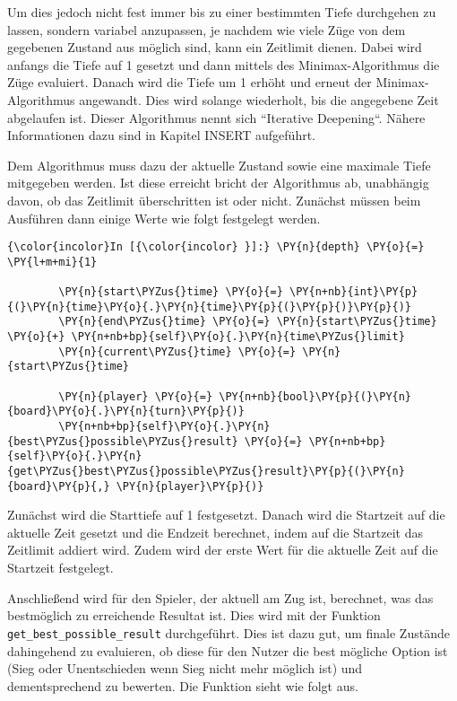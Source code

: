 Um dies jedoch nicht fest immer bis zu einer bestimmten Tiefe durchgehen
zu lassen, sondern variabel anzupassen, je nachdem wie viele Züge von
dem gegebenen Zustand aus möglich sind, kann ein Zeitlimit dienen. Dabei
wird anfangs die Tiefe auf 1 gesetzt und dann mittels des
Minimax-Algorithmus die Züge evaluiert. Danach wird die Tiefe um 1
erhöht und erneut der Minimax-Algorithmus angewandt. Dies wird solange
wiederholt, bis die angegebene Zeit abgelaufen ist. Dieser Algorithmus
nennt sich ``Iterative Deepening``. Nähere Informationen dazu sind in
Kapitel INSERT aufgeführt.

Dem Algorithmus muss dazu der aktuelle Zustand sowie eine maximale Tiefe
mitgegeben werden. Ist diese erreicht bricht der Algorithmus ab,
unabhängig davon, ob das Zeitlimit überschritten ist oder nicht.
Zunächst müssen beim Ausführen dann einige Werte wie folgt festgelegt
werden.

    \begin{Verbatim}[commandchars=\\\{\}]
{\color{incolor}In [{\color{incolor} }]:} \PY{n}{depth} \PY{o}{=} \PY{l+m+mi}{1}
            
        \PY{n}{start\PYZus{}time} \PY{o}{=} \PY{n+nb}{int}\PY{p}{(}\PY{n}{time}\PY{o}{.}\PY{n}{time}\PY{p}{(}\PY{p}{)}\PY{p}{)}
        \PY{n}{end\PYZus{}time} \PY{o}{=} \PY{n}{start\PYZus{}time} \PY{o}{+} \PY{n+nb+bp}{self}\PY{o}{.}\PY{n}{time\PYZus{}limit}
        \PY{n}{current\PYZus{}time} \PY{o}{=} \PY{n}{start\PYZus{}time}
        
        \PY{n}{player} \PY{o}{=} \PY{n+nb}{bool}\PY{p}{(}\PY{n}{board}\PY{o}{.}\PY{n}{turn}\PY{p}{)}
        \PY{n+nb+bp}{self}\PY{o}{.}\PY{n}{best\PYZus{}possible\PYZus{}result} \PY{o}{=} \PY{n+nb+bp}{self}\PY{o}{.}\PY{n}{get\PYZus{}best\PYZus{}possible\PYZus{}result}\PY{p}{(}\PY{n}{board}\PY{p}{,} \PY{n}{player}\PY{p}{)}
\end{Verbatim}

    Zunächst wird die Starttiefe auf 1 festgesetzt. Danach wird die
Startzeit auf die aktuelle Zeit gesetzt und die Endzeit berechnet, indem
auf die Startzeit das Zeitlimit addiert wird. Zudem wird der erste Wert
für die aktuelle Zeit auf die Startzeit festgelegt.

Anschließend wird für den Spieler, der aktuell am Zug ist, berechnet,
was das bestmöglich zu erreichende Resultat ist. Dies wird mit der
Funktion \texttt{get\_best\_possible\_result} durchgeführt. Dies ist
dazu gut, um finale Zustände dahingehend zu evaluieren, ob diese für den
Nutzer die best mögliche Option ist (Sieg oder Unentschieden wenn Sieg
nicht mehr möglich ist) und dementsprechend zu bewerten. Die Funktion
sieht wie folgt aus.


